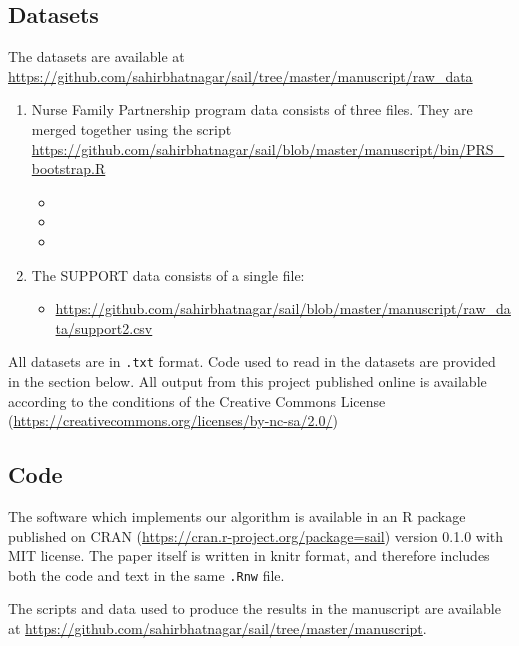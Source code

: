 \documentclass[a4paper,fleqn]{cas-sc}
\begin{document}
\subsection{Datasets}

The datasets are available at \url{https://github.com/sahirbhatnagar/sail/tree/master/manuscript/raw_data}


\begin{enumerate}
	\item Nurse Family Partnership program data consists of three files. They are merged together using the script \url{https://github.com/sahirbhatnagar/sail/blob/master/manuscript/bin/PRS_bootstrap.R}
	\begin{itemize}
		\item {}
		\item {}
		\item \tiny {}
	\end{itemize}
	\normalsize
	\item The SUPPORT data consists of a single file:
	\begin{itemize}
		\item \url{https://github.com/sahirbhatnagar/sail/blob/master/manuscript/raw_data/support2.csv}
	\end{itemize}
\end{enumerate}

All datasets are in \texttt{.txt} format. Code used to read in the datasets are provided in the section below. All output from this project published online is available according to the conditions of the Creative Commons License (\url{https://creativecommons.org/licenses/by-nc-sa/2.0/})

\subsection{Code}

The software which implements our algorithm is available in an R package published on CRAN (\url{https://cran.r-project.org/package=sail}) version 0.1.0 with MIT license. The paper itself is written in knitr format, and therefore includes both the code and text in the same \texttt{.Rnw} file. 

The scripts and data used to produce the results in the manuscript are available at \url{https://github.com/sahirbhatnagar/sail/tree/master/manuscript}. %
\end{document}
